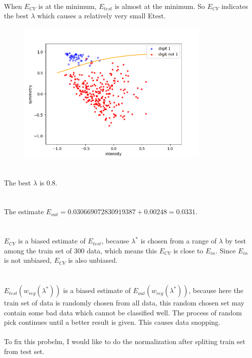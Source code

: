 \documentclass[11pt]{article}
\begin{document}
\\When $E_{CV}$ is at the minimum, $E_{test}$ is almost at the minimum. So $E_{CV}$ indicates the best $\lambda$ which causes a relatively very small Etest.
\newpage
{}\\
\begin{figure}[htb] 
	{\includegraphics[height=7cm]{problem5.png}}
\end{figure}
\\The best $\lambda$ is 0.8.
\\\\
\\
The estimate $E_{out} = 0.030669072830919387 + 0.00248 = 0.0331$.
\\\\
\\
$E_{CV}$ is a biased estimate of $E_{test}$, because $\lambda^*$ is chosen from a range of $\lambda$ by test among the train set of 300 data, which means this $E_{CV}$ is close to $E_{in}$. Since $E_{in}$ is not unbiased, $E_{CV}$ is also unbiased.
\\\\
\\
$E_{test}(w_{reg}(\lambda^*))$ is a biased estimate of $E_{out}(w_{reg}(\lambda^*))$, because here the train set of data is randomly chosen from all data, this random chosen set may contain some bad data which cannot be classified well. The process of random pick continues until a better result is given. This causes data snopping.\\
\\
To fix this probelm, I would like to do the normalization after spliting train set from test set.
\end{document}
